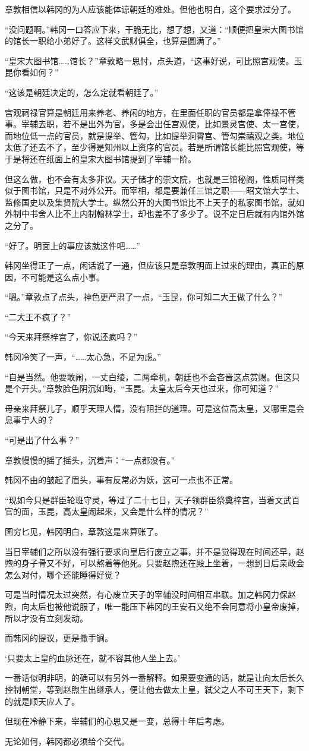 章敦相信以韩冈的为人应该能体谅朝廷的难处。但他也明白，这个要求过分了。

“没问题啊。”韩冈一口答应下来，干脆无比，想了想，又道：“顺便把皇宋大图书馆的馆长一职给小弟好了。这样文武财俱全，也算是圆满了。”

“皇宋大图书馆……馆长？”章敦略一思忖，点头道，“这事好说，可比照宫观使。玉昆你看如何？”

“这该是朝廷决定的，怎么定就看朝廷了。”

宫观祠禄官算是朝廷用来养老、养闲的地方，在里面任职的官员都是拿俸禄不管事。宰辅去职，若不是出外为官，多是会出任宫观使，比如景灵宫使、太一宫使，而地位低一点的官员，就是提举、管勾，比如提举洞霄宫、管勾崇禧观之类。地位太低了还去不了，至少得是知州以上资序的官员。若是所谓馆长能比照宫观使，等于是将还在纸面上的皇宋大图书馆提到了宰辅一阶。

但这么做，也不会有太多非议。天子储才的崇文院，也就是三馆秘阁，性质同样类似于图书馆，只是不对外公开。而宰相，都是要兼任三馆之职——昭文馆大学士、监修国史以及集贤院大学士。纵然公开的大图书馆比不上天子的私家图书馆，就如外制中书舍人比不上内制翰林学士，却也差不了多少了。说不定日后就有内馆外馆之分了。

“好了。明面上的事应该就这件吧……”

韩冈坐得正了一点，闲话说了一通，但应该只是章敦明面上过来的理由，真正的原因，不可能是这么点小事。

“嗯。”章敦点了点头，神色更严肃了一点，“玉昆，你可知二大王做了什么？”

“二大王不疯了？”

“今天来拜祭梓宫了，你说还疯吗？”

韩冈冷笑了一声，“……太心急，不足为虑。”

“自是当然。他要敢闹，一丈白绫，二两牵机，朝廷也不会吝啬这点赏赐。但这只是个开头。”章敦脸色阴沉如晦，“玉昆。太皇太后今天也过来，你可知道？”

母亲来拜祭儿子，顺乎天理人情，没有阻拦的道理。可是这位高太皇，又哪里是会息事宁人的？

“可是出了什么事？”

章敦慢慢的摇了摇头，沉着声：“一点都没有。”

韩冈不由的皱起了眉头，事有反常必为妖，这可一点也不正常。

“现如今只是群臣轮班守灵，等过了二十七日，天子领群臣祭奠梓宫，当着文武百官的面，玉昆，高太皇闹起来，又会是什么样的情况？”

图穷匕见，韩冈明白，章敦这是来算账了。

当日宰辅们之所以没有强行要求向皇后行废立之事，并不是觉得现在时间还早，赵煦的身子骨又不好，可以熬着等他死。只要赵煦还在殿上坐着，一想到日后亲政会怎么对付，哪个还能睡得好觉？

可是当时情况太过突然，有心废立天子的宰辅没时间相互串联。加之韩冈力保赵煦，向太后也被他说服了，唯一能压下韩冈的王安石又绝不会同意将小皇帝废掉，所以才没有立刻发动。

而韩冈的提议，更是撒手锏。

‘只要太上皇的血脉还在，就不容其他人坐上去。’

一番话似明非明，的确可以有另外一番解释。如果要变通的话，就是让向太后长久控制朝堂，等到赵煦生出继承人，便让他去做太上皇，弑父之人不可王天下，剩下的就是顺天应人了。

但现在冷静下来，宰辅们的心思又是一变，总得十年后考虑。

无论如何，韩冈都必须给个交代。

